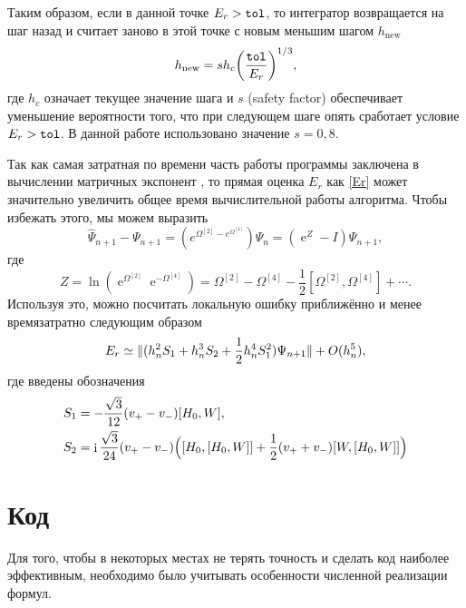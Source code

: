 \documentclass[12pt]{article}
\DeclareMathOperator{\Exp}{e}
\DeclareMathOperator\Iunit{i}
\DeclarePairedDelimiter{\norm}{\lVert}{\rVert}
\renewcommand\exp\Exp
\renewcommand\imath\Iunit
\begin{document}
Таким образом, если в данной точке $E_r>\text{\texttt{tol}}$, то интегратор
возвращается на шаг назад и считает заново в этой точке с новым меньшим шагом
$h_{\text{new}}$
\begin{equation}
  h_{\text{new}}=sh_c\biggl(\frac{\text{\texttt{tol}}}{E_r}\biggr)^{1/3},
\end{equation}
где $h_c$ означает текущее значение шага и $s$ (safety factor) обеспечивает
уменьшение вероятности того, что при следующем шаге опять сработает условие
$E_r>\text{\texttt{tol}}$. В данной работе использовано значение $s=0{,}8$.

Так как самая затратная по времени часть работы программы заключена в вычислении
матричных экспонент%
, то прямая оценка $E_r$ как \eqref{Er} может значительно
увеличить общее время вычислительной работы алгоритма. Чтобы избежать этого, мы
можем выразить
\begin{equation}
  \hat\Psi_{n+1}-\Psi_{n+1}=(e^{\Omega^{[2]}-e^{\Omega^{[4]}}})\Psi_n=(\exp^Z-I)\Psi_{n+1},
\end{equation}
где 
\begin{equation}\label{Z}
  Z=\ln(\exp^{\Omega^{[2]}}\exp^{-\Omega^{[4]}})=\Omega^{[2]} - \Omega^{[4]} -
  \frac{1}{2}[\Omega^{[2]},\Omega^{[4]}]+\cdots .
\end{equation}
Используя это, можно посчитать локальную ошибку приближённо и менее
времязатратно следующим образом
\begin{equation}
  E_r\simeq\norm{(h^2_n S_1+h^3_n S_2 + \frac{1}{2}h^4_n S^2_1)\Psi_{n+1}} +
  O(h^5_n),
\end{equation}
где введены обозначения
\begin{align}
  S_1&=-\frac{\sqrt{3}}{12}(v_+-v_-)[H_0,W],\\
  S_2&=\imath\frac{\sqrt{3}}{24}(v_+-v_-)\Bigl([H_0,[H_0,W]]+\frac{1}{2}(v_++v_-)[W,[H_0,W]]\Bigr)
\end{align}

\section{Код}

Для того, чтобы в некоторых местах не терять точность и сделать код наиболее
эффективным, необходимо было учитывать особенности численной реализации формул.
\end{document}
